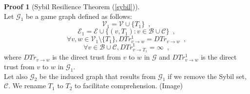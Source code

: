 \documentclass[11pt]{llncs}
\theoremstyle{definition}
\newtheorem{sepproof}{Proof}
\begin{document}
    \begin{sepproof}[Sybil Resilience Theorem (\ref{sybil})] \ \\
    \label{sybilproof}
       Let $\mathcal{G}_1$ be a game graph defined as follows:
       \begin{equation}
          \mathcal{V}_1 = \mathcal{V} \cup \{T_1\} \enspace,
       \end{equation}
       \begin{equation}
          \mathcal{E}_1 = \mathcal{E} \cup \{(v, T_1) : v \in \mathcal{B} \cup \mathcal{C}\} \enspace,
       \end{equation}
       \begin{equation}
          \forall v,w \in \mathcal{V}_1 \setminus \{T_1\}, DTr^1_{v \rightarrow w} = DTr_{v \rightarrow w} \enspace,
       \end{equation}
       \begin{equation}
          \forall v \in \mathcal{B} \cup \mathcal{C}, DTr^1_{v \rightarrow T_1} = \infty \enspace,
       \end{equation}
       where $DTr_{v \rightarrow w}$ is the direct trust from $v$ to $w$ in $\mathcal{G}$ and $DTr^1_{v \rightarrow w}$ is
       the direct trust from $v$ to $w$ in $\mathcal{G}_1$. \\
       Let also $\mathcal{G}_2$ be the induced graph that results from $\mathcal{G}_1$ if we remove the Sybil set,
       $\mathcal{C}$. We rename $T_1$ to $T_2$ to facilitate comprehension. (Image) \\

\end{sepproof}
\end{document}
